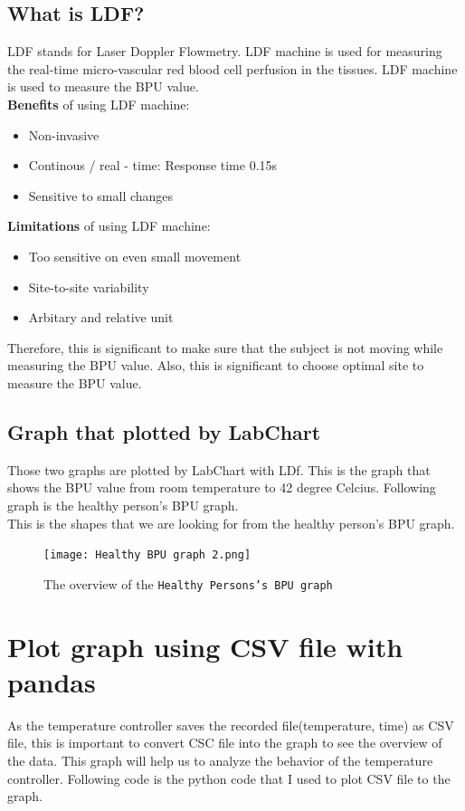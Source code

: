 \documentclass{article}
\begin{document}
\subsection{What is LDF?}
LDF stands for Laser Doppler Flowmetry. 
LDF machine is used for measuring the real-time micro-vascular red blood cell perfusion in the tissues.
LDF machine is used to measure the BPU value. \\
\textbf{Benefits} of using LDF machine:
\begin{itemize}
\item {Non-invasive}
\item {Continous / real - time: Response time 0.15s}
\item {Sensitive to small changes}
\end{itemize}

\textbf{Limitations} of using LDF machine:
\begin{itemize}
\item {Too sensitive on even small movement}
\item {Site-to-site variability}
\item {Arbitary and relative unit}
\end{itemize}
Therefore, this is significant to make sure that the subject is not moving while measuring the BPU value.
Also, this is significant to choose optimal site to measure the BPU value.
\subsection{Graph that plotted by LabChart}
Those two graphs are plotted by LabChart with LDf. 
This is the graph that shows the BPU value from room temperature to 42 degree Celcius.
Following graph is the healthy person's BPU graph. \\
This is the shapes that we are looking for from the healthy person's BPU graph.
\begin{figure}[htpb]
    \centering
    \texttt{[image: Healthy BPU graph 2.png]}
    \caption{The overview of the \texttt{Healthy Persons's BPU graph}}
    \label{fig:s_r}
\end{figure}

\section{Plot graph using CSV file with pandas}
As the temperature controller saves the recorded file(temperature, time) as CSV file,
this is important to convert CSC file into the graph to see the overview of the data.
This graph will help us to analyze the behavior of the temperature controller.
Following code is the python code that I used to plot CSV file to the graph. 
\end{document}
